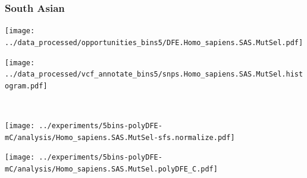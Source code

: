\subsubsection{South Asian}

\begin{minipage}{0.49\linewidth}
    \texttt{[image: ../data\_processed/opportunities\_bins5/DFE.Homo\_sapiens.SAS.MutSel.pdf]}
\end{minipage}
\begin{minipage}{0.49\linewidth}
    \texttt{[image: ../data\_processed/vcf\_annotate\_bins5/snps.Homo\_sapiens.SAS.MutSel.histogram.pdf]}
\end{minipage}
\\
\begin{minipage}{0.49\linewidth}
    \texttt{[image: ../experiments/5bins-polyDFE-mC/analysis/Homo\_sapiens.SAS.MutSel-sfs.normalize.pdf]}
\end{minipage}
\begin{minipage}{0.4\linewidth}
    \texttt{[image: ../experiments/5bins-polyDFE-mC/analysis/Homo\_sapiens.SAS.MutSel.polyDFE\_C.pdf]}
\end{minipage}
